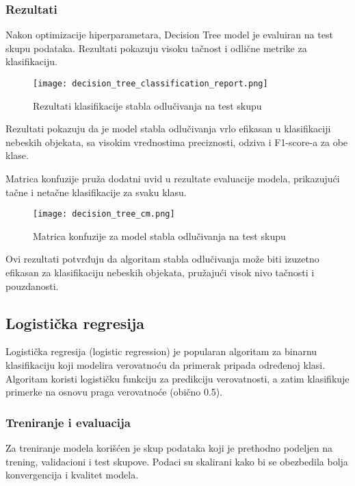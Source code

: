 \documentclass[a4paper,12pt]{article}
\begin{document}
\subsubsection{Rezultati}

Nakon optimizacije hiperparametara, Decision Tree model je evaluiran na test skupu podataka. Rezultati pokazuju visoku tačnost i odlične metrike za klasifikaciju.

\begin{figure}[h!]
\centering
\texttt{[image: decision\_tree\_classification\_report.png]}
\caption{Rezultati klasifikacije stabla odlučivanja na test skupu}
\label{fig:decision_tree_classification_report}
\end{figure}

Rezultati pokazuju da je model stabla odlučivanja vrlo efikasan u klasifikaciji nebeskih objekata, sa visokim vrednostima preciznosti, odziva i F1-score-a za obe klase.

\clearpage

Matrica konfuzije pruža dodatni uvid u rezultate evaluacije modela, prikazujući tačne i netačne klasifikacije za svaku klasu.

\begin{figure}[h!]
\centering
\texttt{[image: decision\_tree\_cm.png]}
\caption{Matrica konfuzije za model stabla odlučivanja na test skupu}
\label{fig:decision_tree_cm}
\end{figure}

Ovi rezultati potvrđuju da algoritam stabla odlučivanja može biti izuzetno efikasan za klasifikaciju nebeskih objekata, pružajući visok nivo tačnosti i pouzdanosti.

\subsection{Logistička regresija}
Logistička regresija (logistic regression) je popularan algoritam za binarnu klasifikaciju koji modelira verovatnoću da primerak pripada određenoj klasi. Algoritam koristi logističku funkciju za predikciju verovatnosti, a zatim klasifikuje primerke na osnovu praga verovatnoće (obično 0.5).

\subsubsection{Treniranje i evaluacija}
Za treniranje modela korišćen je skup podataka koji je prethodno podeljen na trening, validacioni i test skupove. Podaci su skalirani kako bi se obezbedila bolja konvergencija i kvalitet modela.
\end{document}

